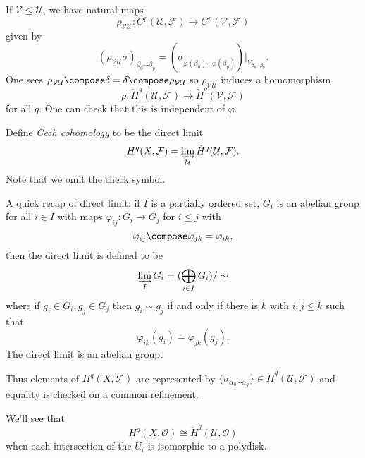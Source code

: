 \documentclass[a4paper]{article}
\begin{document}
If \(\mathcal V \leq \mathcal U\), we have natural maps
\[
  \rho_{\mathcal V \mathcal U}: C^p(\mathcal U, \mathcal F) \to C^p(\mathcal V, \mathcal F)
\]
given by
\[
  (\rho_{\mathcal V \mathcal U} \sigma)_{\beta_0 \cdots \beta_p} = (\sigma_{\varphi(\beta_0) \cdots \varphi(\beta_p)})|_{V_{\beta_0 \cdots \beta_p}}.
\]
One sees \(\rho_{\mathcal V \mathcal U} \compose \delta = \delta \compose \rho_{\mathcal V \mathcal U}\) so \(\rho_{\mathcal V \mathcal U}\) induces a homomorphism
\[
  \rho: \check H^q(\mathcal U, \mathcal F) \to \check H^q(\mathcal V, \mathcal F)
\]
for all \(q\). One can check that this is independent of \(\varphi\).

\begin{definition}
  Define \emph{Čech cohomology} to be the direct limit
  \[
    H^q(X, \mathcal F) = \varinjlim_{\mathcal U} \check H^q(\mathcal U, \mathcal F).
  \]
  Note that we omit the check symbol.
\end{definition}

A quick recap of direct limit: if \(I\) is a partially ordered set, \(G_i\) is an abelian group for all \(i \in I\) with maps \(\varphi_{ij}: G_i \to G_j\) for \(i \leq j\) with
\[
  \varphi_{ij} \compose \varphi_{jk} = \varphi_{ik},
\]
then the direct limit is defined to be
\[
  \varinjlim_I G_i = (\bigoplus_{i \in I} G_i) /\sim
\]
where if \(g_i \in G_i, g_j \in G_j\) then \(g_i \sim g_j\) if and only if there is \(k\) with \(i, j \leq k\) such that
\[
  \varphi_{ik} (g_i) = \varphi_{jk} (g_j).
\]
The direct limit is an abelian group.

Thus elements of \(H^q(X, \mathcal F)\) are represented by \(\{\sigma_{\alpha_0 \cdots \alpha_q}\} \in \check H^q(\mathcal U, \mathcal F)\) and equality is checked on a common refinement.

We'll see that
\[
  H^q(X, \mathcal O) \cong \check H^q(\mathcal U, \mathcal O)
\]
when each intersection of the \(U_i\) is isomorphic to a polydisk.
\end{document}
